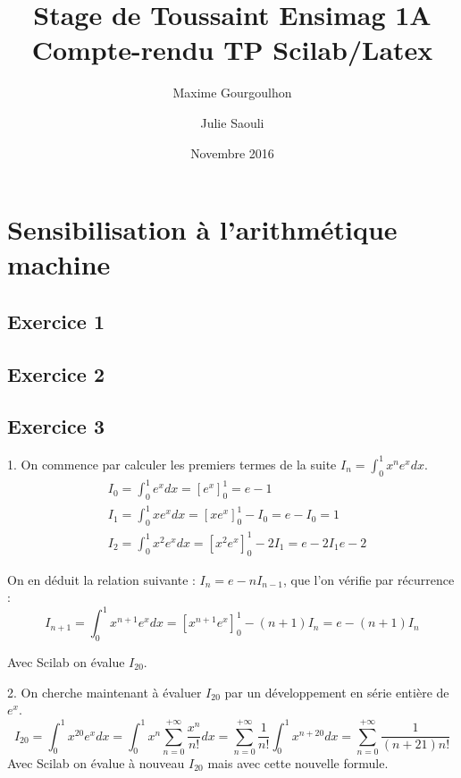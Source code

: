 \documentclass[a4paper,11pt]{article}
\title{Stage de Toussaint Ensimag 1A \\ Compte-rendu TP Scilab/Latex}
\author{Maxime Gourgoulhon \and Julie Saouli}
\date{Novembre 2016}
\begin{document}
\maketitle


\section{Sensibilisation à l'arithmétique machine}

\subsection*{Exercice 1}

\subsection*{Exercice 2}

\subsection*{Exercice 3}
	1. On commence par calculer les premiers termes de la suite $I_{n} = \int_0^1 x^{n} e^{x} dx$.
	\begin{align*}
		& I_{0} = \int_0^1 e^{x} dx = [e^{x}]_0^1 = e - 1 \\
		& I_{1} = \int_0^1 x e^{x} dx = [x e^{x}]_0^1 - I_{0} = e - I_{0} = 1 \\
		& I_{2} = \int_0^1 x^{2} e^{x} dx = [x^{2} e^{x}]_0^1 - 2I_{1} = e - 2I_{1} e - 2
	\end{align*}

	On en déduit la relation suivante : $I_{n} = e - nI_{n-1}$, que l'on vérifie par récurrence :
	\begin{equation*}
		I_{n+1} = \int_0^1 x^{n+1} e^{x} dx = [x^{n+1} e^{x}]_0^1 - (n+1) I_{n} = e - (n+1)I_{n}
	\end{equation*}

	Avec Scilab on évalue $I_{20}$.

	2. On cherche maintenant à évaluer $I_{20}$ par un développement en série entière de $e^{x}$.
	\begin{equation*}
		I_{20} = \int_0^1 x^{20} e^{x} dx
		= \int_0^1 x^{n} \sum_{n=0}^{+\infty} \frac{x^{n}}{n!} dx
		= \sum_{n=0}^{+\infty} \frac{1}{n!} \int_0^1 x^{n+20} dx
		= \sum_{n=0}^{+\infty} \frac{1}{(n+21)n!}
	\end{equation*}
	Avec Scilab on évalue à nouveau $I_{20}$ mais avec cette nouvelle formule.
	
\end{document}
